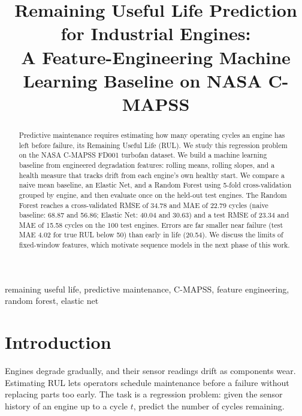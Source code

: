 \documentclass[conference]{IEEEtran}
\newcommand{\TODO}[1]{\textcolor{red}{[#1]}}
\begin{document}
\title{Remaining Useful Life Prediction for Industrial Engines:\\
A Feature-Engineering Machine Learning Baseline on NASA C-MAPSS}

\author{\IEEEauthorblockN{\TODO{Member 1}, \TODO{Member 2}, \TODO{Member 3}, \TODO{Member 4}, \TODO{Member 5}}
\IEEEauthorblockA{\TODO{Department, Institution}\\
\TODO{emails}}}

\maketitle

\begin{abstract}
Predictive maintenance requires estimating how many operating cycles an engine has left before failure, its Remaining Useful Life (RUL). We study this regression problem on the NASA C-MAPSS FD001 turbofan dataset. We build a machine learning baseline from engineered degradation features: rolling means, rolling slopes, and a health measure that tracks drift from each engine's own healthy start. We compare a naive mean baseline, an Elastic Net, and a Random Forest using 5-fold cross-validation grouped by engine, and then evaluate once on the held-out test engines. The Random Forest reaches a cross-validated RMSE of 34.78 and MAE of 22.79 cycles (naive baseline: 68.87 and 56.86; Elastic Net: 40.04 and 30.63) and a test RMSE of 23.34 and MAE of 15.58 cycles on the 100 test engines. Errors are far smaller near failure (test MAE 4.02 for true RUL below 50) than early in life (20.54). We discuss the limits of fixed-window features, which motivate sequence models in the next phase of this work.
\end{abstract}

\begin{IEEEkeywords}
remaining useful life, predictive maintenance, C-MAPSS, feature engineering, random forest, elastic net
\end{IEEEkeywords}

\section{Introduction}
Engines degrade gradually, and their sensor readings drift as components wear. Estimating RUL lets operators schedule maintenance before a failure without replacing parts too early. The task is a regression problem: given the sensor history of an engine up to a cycle $t$, predict the number of cycles remaining.
\end{document}
